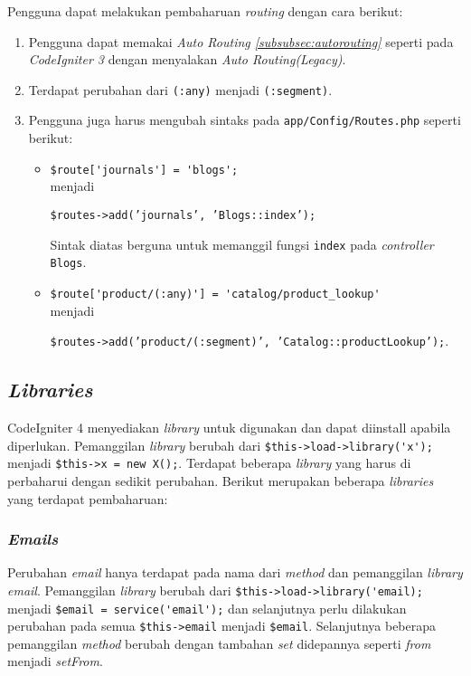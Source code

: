 Pengguna dapat melakukan pembaharuan \textit{routing} dengan cara berikut:
\begin{enumerate}
\item Pengguna dapat memakai \textit{Auto Routing \ref{subsubsec:autorouting}} seperti pada \textit{CodeIgniter 3} dengan menyalakan \textit{Auto Routing(Legacy)}.
\item Terdapat perubahan dari \verb|(:any)| menjadi \verb|(:segment)|.
\item Pengguna juga harus mengubah sintaks pada \verb|app/Config/Routes.php| seperti berikut:
	\begin{itemize}
	\item \verb|$route['journals'] = 'blogs';| \\ menjadi 
	\begin{center}	
	\texttt{\$routes->add('journals', 'Blogs::index');} 
	\end{center}
	Sintak diatas berguna untuk memanggil fungsi \texttt{index} pada \textit{controller} \texttt{Blogs}.
	\item \verb|$route['product/(:any)'] = 'catalog/product_lookup'|\\ menjadi 
	\begin{center}	
		\texttt{\$routes->add('product/(:segment)', 'Catalog::productLookup');}.
	\end{center}
	\end{itemize}
\end{enumerate}

\subsection{\textit{Libraries}}
 
CodeIgniter 4 menyediakan \textit{library} untuk digunakan dan dapat diinstall apabila diperlukan. Pemanggilan \textit{library} berubah dari \verb|$this->load->library('x');| menjadi \verb|$this->x = new X();|. Terdapat beberapa \textit{library} yang harus di perbaharui dengan sedikit perubahan. Berikut merupakan beberapa \textit{libraries} yang terdapat pembaharuan:

\subsubsection{\textit{Emails}}

Perubahan \textit{email} hanya terdapat pada nama dari \textit{method} dan pemanggilan \textit{library email}. Pemanggilan  \textit{library} berubah dari \verb|$this->load->library('email);| menjadi \verb|$email = service('email');| dan selanjutnya perlu dilakukan perubahan pada semua \verb|$this->email| menjadi \verb|$email|. Selanjutnya beberapa pemanggilan \textit{method} berubah dengan tambahan \textit{set} didepannya seperti \textit{from} menjadi \textit{setFrom}.

